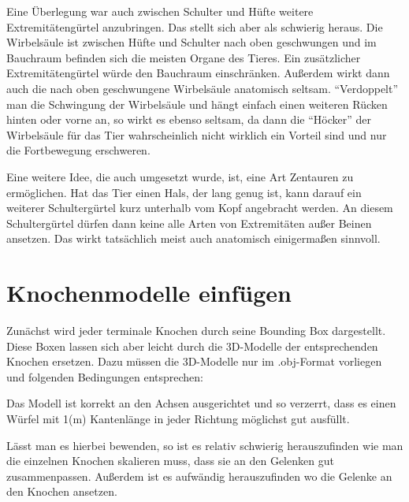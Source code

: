 Eine Überlegung war auch zwischen Schulter und Hüfte weitere Extremitätengürtel anzubringen. Das stellt sich aber als schwierig heraus. Die Wirbelsäule ist zwischen Hüfte und Schulter nach oben geschwungen und im Bauchraum befinden sich die meisten Organe des Tieres. Ein zusätzlicher Extremitätengürtel würde den Bauchraum einschränken. Außerdem wirkt dann auch die nach oben geschwungene Wirbelsäule anatomisch seltsam.
"`Verdoppelt"' man die Schwingung der Wirbelsäule und hängt einfach einen weiteren Rücken hinten oder vorne an, so wirkt es ebenso seltsam, da dann die "`Höcker"' der Wirbelsäule für das Tier wahrscheinlich nicht wirklich ein Vorteil sind und nur die Fortbewegung erschweren.

Eine weitere Idee, die auch umgesetzt wurde, ist, eine Art Zentauren zu ermöglichen. Hat das Tier einen Hals, der lang genug ist, kann darauf ein weiterer Schultergürtel kurz unterhalb vom Kopf angebracht werden. An diesem Schultergürtel dürfen dann keine alle Arten von Extremitäten außer Beinen ansetzen. Das wirkt tatsächlich meist auch anatomisch einigermaßen sinnvoll.


\section{Knochenmodelle einfügen}

Zunächst wird jeder terminale Knochen durch seine Bounding Box dargestellt. Diese Boxen lassen sich aber leicht durch die 3D-Modelle der entsprechenden Knochen ersetzen. Dazu müssen die 3D-Modelle nur im .obj-Format vorliegen und folgenden Bedingungen entsprechen:

Das Modell ist korrekt an den Achsen ausgerichtet und so verzerrt, dass es einen Würfel mit 1(m) Kantenlänge in jeder Richtung möglichst gut ausfüllt.

Lässt man es hierbei bewenden, so ist es relativ schwierig herauszufinden wie man die einzelnen Knochen skalieren muss, dass sie an den Gelenken gut zusammenpassen. Außerdem ist es aufwändig herauszufinden wo die Gelenke an den Knochen ansetzen.

